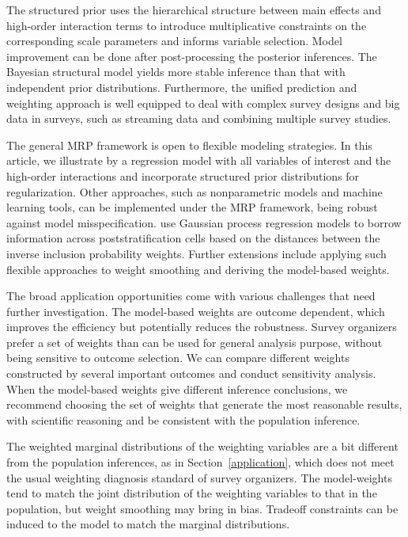 \documentclass[11pt]{article}
\numberwithin{figure}{section}
\numberwithin{table}{section}
\numberwithin{equation}{section}
\begin{document}
The structured prior uses the hierarchical structure between main effects and
high-order interaction terms to introduce multiplicative constraints on the
corresponding scale parameters and informs variable selection. Model
improvement can be done after post-processing the posterior inferences. The
Bayesian structural model yields more stable inference than that with
independent prior distributions. Furthermore, the unified prediction and
weighting approach is well equipped to deal with complex survey designs and big
data in surveys, such as streaming data and combining multiple survey studies. 

The general MRP framework is open to flexible modeling strategies. In this
article, we illustrate by a regression model with all variables of interest and
the high-order interactions and incorporate structured prior distributions for
regularization. Other approaches, such as nonparametric models and machine
learning tools, can be implemented under the MRP framework, being robust
against model misspecification. \cite{bnfp:ba15} use Gaussian process
regression models to borrow information across poststratification cells based
on the distances between the inverse inclusion probability weights. Further
extensions include applying such flexible approaches to weight smoothing and
deriving the model-based weights. 

The broad application opportunities come with various challenges that need
further investigation. The model-based weights are outcome dependent, which
improves the efficiency but potentially reduces the robustness. Survey
organizers prefer a set of weights than can be used for general analysis
purpose, without being sensitive to outcome selection. We can compare different
weights constructed by several important outcomes and conduct sensitivity
analysis. When the model-based weights give different inference conclusions, we
recommend choosing the set of weights that generate the most reasonable
results, with scientific reasoning and be consistent with the population
inference. 

The weighted marginal distributions of the weighting variables are a bit
different from the population inferences, as in Section~\ref{application},
which does not meet the usual weighting diagnosis standard of survey
organizers. The model-weights tend to match the joint distribution of the
weighting variables to that in the population, but weight smoothing may bring
in bias. Tradeoff constraints can be induced to the model to match the marginal
distributions. 
\end{document}
